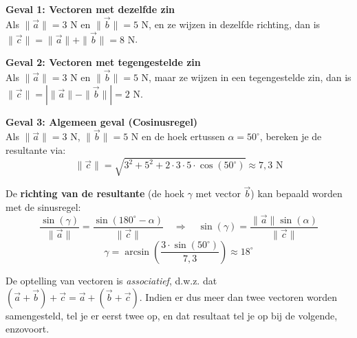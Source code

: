 \documentclass{ximera}
\begin{document}
\begin{example}[title={Voorbeelden van vectoroptellingen}]\nl
    \textbf{Geval 1: Vectoren met dezelfde zin} \\
    Als $\|\vec{a}\| = 3\text{ N}$ en $\|\vec{b}\| = 5\text{ N}$, en ze wijzen in dezelfde richting, dan is $\| \vec{c} \| = \|\vec{a}\| + \|\vec{b}\| = 8\text{ N}$.
    
    \begin{center}
        \captionsetup{width=0.85\textwidth}
    \end{center}

    \textbf{Geval 2: Vectoren met tegengestelde zin} \\
    Als $\|\vec{a}\| = 3\text{ N}$ en $\|\vec{b}\| = 5\text{ N}$, maar ze wijzen in een tegengestelde zin, dan is $\| \vec{c} \| = | \|\vec{a}\| - \|\vec{b}\| | = 2\text{ N}$.
    
    \begin{center}
        \captionsetup{width=0.85\textwidth}
    \end{center}

    \textbf{Geval 3: Algemeen geval (Cosinusregel)} \\
    Als $\|\vec{a}\| = 3\text{ N}$, $\|\vec{b}\| = 5\text{ N}$ en de hoek ertussen $\alpha = 50^\circ$, bereken je de resultante via:
    \[ \|\vec{c}\| = \sqrt{3^2 + 5^2 + 2 \cdot 3 \cdot 5 \cdot \cos(50^\circ)} \approx 7,3\text{ N} \]

    De \textbf{richting van de resultante} (de hoek $\gamma$ met vector $\vec{b}$) kan bepaald worden met de sinusregel: 
    \[ \frac{\sin(\gamma)}{\|\vec{a}\|} = \frac{\sin(180^\circ-\alpha)}{\|\vec{c}\|} \quad \Longrightarrow \quad \sin(\gamma) = \frac{\|\vec{a}\|\sin(\alpha)}{\|\vec{c}\|} \]
    \[ \gamma = \arcsin\left(\frac{3 \cdot \sin(50^\circ)}{7,3}\right) \approx 18^\circ \]
\end{example}

\begin{remark}
    De optelling van vectoren is \textit{associatief}, d.w.z. dat $(\vec{a} + \vec{b}) + \vec{c} = \vec{a} + (\vec{b} + \vec{c})$. Indien er dus meer dan twee vectoren worden samengesteld, tel je er eerst twee op, en dat resultaat tel je op bij de volgende, enzovoort.
\end{remark}
\end{document}
